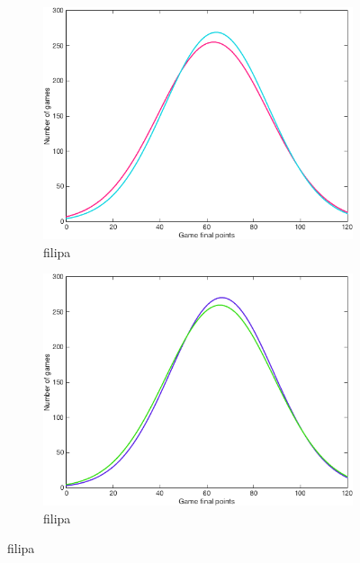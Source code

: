 \begin{figure}[h]
        \centering
        \begin{subfigure}[h]{0.4\textwidth}
                \includegraphics[width=\textwidth]{./img/4/FH}
                \caption{filipa}
                \label{fig:FH}
        \end{subfigure}
        \begin{subfigure}[h]{0.4\textwidth}
                \includegraphics[width=\textwidth]{./img/4/GI}
                \caption{filipa}
                \label{fig:GI}
        \end{subfigure}
        \caption{filipa}
        \label{fig:FGHI}
\end{figure}

